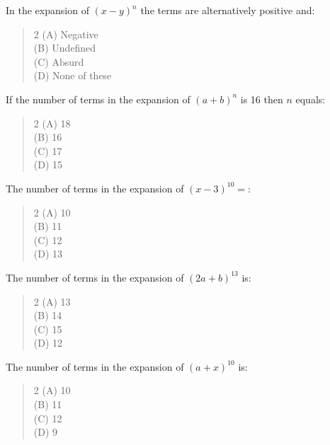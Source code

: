 \documentclass[11pt,a4paper]{article}
\begin{document}
\begin{mcqlist}
\item In the expansion of $(x-y)^n$ the terms are alternatively positive and:
\begin{quote}\begin{multicols}{2}
\noindent (A) Negative \\
(B) Undefined \\
(C) Absurd \\
(D) None of these
\end{multicols}\end{quote}

\item If the number of terms in the expansion of $(a+b)^n$ is 16 then $n$ equals:
\begin{quote}\begin{multicols}{2}
\noindent (A) 18 \\
(B) 16 \\
(C) 17 \\
(D) 15
\end{multicols}\end{quote}

\item The number of terms in the expansion of $(x-3)^{10}=$:
\begin{quote}\begin{multicols}{2}
\noindent (A) 10 \\
(B) 11 \\
(C) 12 \\
(D) 13
\end{multicols}\end{quote}

\item The number of terms in the expansion of $(2a+b)^{13}$ is:
\begin{quote}\begin{multicols}{2}
\noindent (A) 13 \\
(B) 14 \\
(C) 15 \\
(D) 12
\end{multicols}\end{quote}

\item The number of terms in the expansion of $(a+x)^{10}$ is:
\begin{quote}\begin{multicols}{2}
\noindent (A) 10 \\
(B) 11 \\
(C) 12 \\
(D) 9
\end{multicols}\end{quote}


\end{mcqlist}
\end{document}
